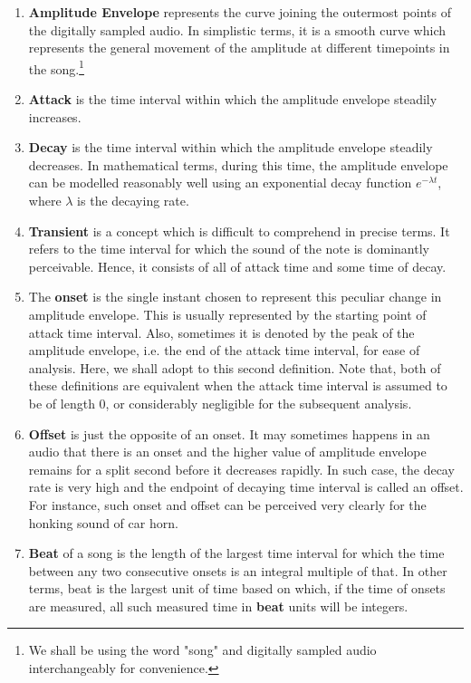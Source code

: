 \documentclass[10pt]{article}
\begin{document}
\begin{enumerate}
    \item \textbf{Amplitude Envelope} represents the curve joining the outermost points of the digitally sampled audio. In simplistic terms, it is a smooth curve which represents the general movement of the amplitude at different timepoints in the song.\footnote{We shall be using the word "song" and digitally sampled audio interchangeably for convenience.}
    
    \item \textbf{Attack} is the time interval within which the amplitude envelope steadily increases.
    
    \item \textbf{Decay} is the time interval within which the amplitude envelope steadily decreases. In mathematical terms, during this time, the amplitude envelope can be modelled reasonably well using an exponential decay function $e^{-\lambda t}$, where $\lambda$ is the decaying rate.
    
    \item \textbf{Transient} is a concept which is difficult to comprehend in precise terms. It refers to the time interval for which the sound of the note is dominantly perceivable. Hence, it consists of all of attack time and some time of decay.
    
    \item The \textbf{onset} is the single instant chosen to represent this peculiar change in amplitude envelope. This is usually represented by the starting point of attack time interval. Also, sometimes it is denoted by the peak of the amplitude envelope, i.e. the end of the attack time interval, for ease of analysis. Here, we shall adopt to this second definition. Note that, both of these definitions are equivalent when the attack time interval is assumed to be of length 0, or considerably negligible for the subsequent analysis.
    
    \item \textbf{Offset} is just the opposite of an onset. It may sometimes happens in an audio that there is an onset and the higher value of amplitude envelope remains for a split second before it decreases rapidly. In such case, the decay rate is very high and the endpoint of decaying time interval is called an offset. For instance, such onset and offset can be perceived very clearly for the honking sound of car horn.
    
    \item \textbf{Beat} of a song is the length of the largest time interval for which the time between any two consecutive onsets is an integral multiple of that. In other terms, beat is the largest unit of time based on which, if the time of onsets are measured, all such measured time in \textbf{beat} units will be integers.
\end{enumerate}
\end{document}
